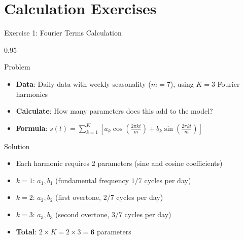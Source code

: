 \documentclass[9pt, aspectratio=169, t]{beamer}
\begin{document}
\section{Calculation Exercises}

\begin{frame}{Exercise 1: Fourier Terms Calculation}
    \begin{cminipage}{0.95\textwidth}
    \begin{alertblock}{Problem}
        \begin{itemize}\setlength{\itemsep}{0pt}
            \item \textbf{Data}: Daily data with weekly seasonality ($m=7$), using $K=3$ Fourier harmonics
            \item \textbf{Calculate}: How many parameters does this add to the model?
            \item \textbf{Formula}: $s(t) = \sum_{k=1}^{K} \left[ a_k \cos\left(\frac{2\pi k t}{m}\right) + b_k \sin\left(\frac{2\pi k t}{m}\right) \right]$
        \end{itemize}
    \end{alertblock}

    \vspace{0.2cm}
    \begin{exampleblock}{Solution}
        \begin{itemize}\setlength{\itemsep}{0pt}
            \item Each harmonic requires 2 parameters (sine and cosine coefficients)
            \item $k=1$: $a_1, b_1$ (fundamental frequency $1/7$ cycles per day)
            \item $k=2$: $a_2, b_2$ (first overtone, $2/7$ cycles per day)
            \item $k=3$: $a_3, b_3$ (second overtone, $3/7$ cycles per day)
            \item \textbf{Total}: $2 \times K = 2 \times 3 = \textbf{6}$ parameters
        \end{itemize}
    \end{exampleblock}
    \end{cminipage}
\end{frame}
\end{document}
